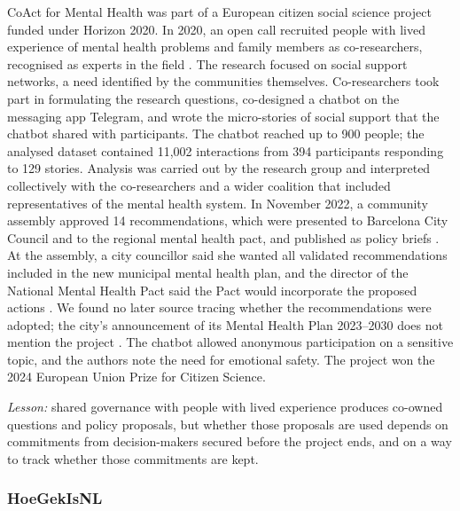 \documentclass[
  number,
  preprint]{elsarticle}
\begin{document}
CoAct for Mental Health was part of a European citizen social science
project funded under Horizon 2020. In 2020, an open call recruited
people with lived experience of mental health problems and family
members as co-researchers, recognised as experts in the field
\citep{casanovas2026}. The research focused on social support networks,
a need identified by the communities themselves. Co-researchers took
part in formulating the research questions, co-designed a chatbot on the
messaging app Telegram, and wrote the micro-stories of social support
that the chatbot shared with participants. The chatbot reached up to 900
people; the analysed dataset contained 11,002 interactions from 394
participants responding to 129 stories. Analysis was carried out by the
research group and interpreted collectively with the co-researchers and
a wider coalition that included representatives of the mental health
system. In November 2022, a community assembly approved 14
recommendations, which were presented to Barcelona City Council and to
the regional mental health pact, and published as policy briefs
\citep{casanovas2026}. At the assembly, a city councillor said she
wanted all validated recommendations included in the new municipal
mental health plan, and the director of the National Mental Health Pact
said the Pact would incorporate the proposed actions
\citep{ub2022assembly, mitats2022}. We found no later source tracing
whether the recommendations were adopted; the city's announcement of its
Mental Health Plan 2023--2030 does not mention the project
\citep{bcn2023plan}. The chatbot allowed anonymous participation on a
sensitive topic, and the authors note the need for emotional safety. The
project won the 2024 European Union Prize for Citizen Science.

\emph{Lesson:} shared governance with people with lived experience
produces co-owned questions and policy proposals, but whether those
proposals are used depends on commitments from decision-makers secured
before the project ends, and on a way to track whether those commitments
are kept.

\subsubsection{HoeGekIsNL}\label{hoegekisnl}
\end{document}
